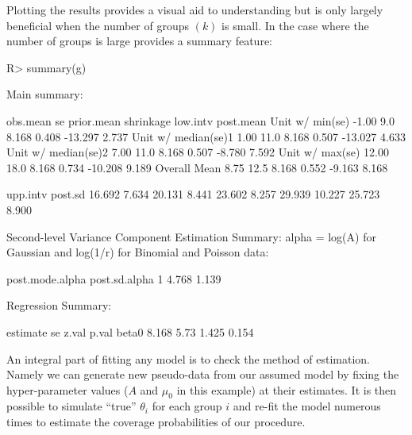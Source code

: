 \documentclass[article]{jss}
\begin{document}
Plotting the results provides a visual aid to understanding but is only largely beneficial when the number of groups $(k)$ is small. In the case where the number of groups is large  provides a summary feature:

\begin{CodeChunk}
\begin{CodeInput}
R> summary(g)
\end{CodeInput}
\begin{CodeOutput}
Main summary:

                    obs.mean   se prior.mean shrinkage low.intv post.mean
Unit w/ min(se)        -1.00  9.0      8.168     0.408  -13.297     2.737
Unit w/ median(se)1     1.00 11.0      8.168     0.507  -13.027     4.633
Unit w/ median(se)2     7.00 11.0      8.168     0.507   -8.780     7.592
Unit w/ max(se)        12.00 18.0      8.168     0.734  -10.208     9.189
Overall Mean            8.75 12.5      8.168     0.552   -9.163     8.168

                     upp.intv post.sd
                       16.692   7.634
                       20.131   8.441
                       23.602   8.257
                       29.939  10.227
                       25.723   8.900

Second-level Variance Component Estimation Summary:
alpha = log(A) for Gaussian and log(1/r) for Binomial and Poisson data:

  post.mode.alpha post.sd.alpha
1           4.768         1.139


Regression Summary:

      estimate   se z.val p.val
beta0    8.168 5.73 1.425 0.154
\end{CodeOutput}
\end{CodeChunk}


An integral part of fitting any model is to check the method of estimation. Namely we can generate new pseudo-data from our assumed model by fixing the hyper-parameter values ($A$ and $\mu_0$ in this example) at their estimates. It is then possible to simulate ``true'' $\theta_i$ for each group $i$ and re-fit the model numerous times to estimate the coverage probabilities of our procedure.  
\end{document}
